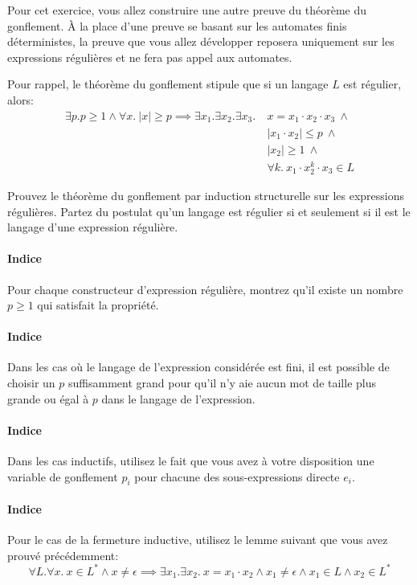 \documentclass[12pt,french,a4paper]{article}
\begin{document}
\begin{question}
Pour cet exercice, vous allez construire une autre preuve du théorème du gonflement.
À la place d'une preuve se basant sur les automates finis déterministes, la preuve que vous allez développer reposera uniquement sur les expressions régulières et ne fera pas appel aux automates.

Pour rappel, le théorème du gonflement stipule que si un langage $L$ est régulier, alors:
\begin{align*}
\exists p. p \geq 1 \wedge \forall x.\ |x| \geq p \implies \exists x_1. \exists x_2. \exists x_3.\ &x = x_1 \cdot x_2 \cdot x_3\ \wedge\\
&|x_1 \cdot x_2| \leq p\ \wedge\\
&|x_2| \geq 1\ \wedge\\
&\forall k.\ x_1 \cdot x_2^k \cdot x_3 \in L
\end{align*}

Prouvez le théorème du gonflement par induction structurelle sur les expressions régulières.
Partez du postulat qu'un langage est régulier si et seulement si il est le langage d'une expression régulière.

\paragraph{Indice} Pour chaque constructeur d'expression régulière, montrez qu'il existe un nombre $p \geq 1$ qui satisfait la propriété.

\paragraph{Indice} Dans les cas où le langage de l'expression considérée est fini, il est possible de choisir un $p$ suffisamment grand pour qu'il n'y aie aucun mot de taille plus grande ou égal à $p$ dans le langage de l'expression.

\paragraph{Indice} Dans les cas inductifs, utilisez le fait que vous avez à votre disposition une variable de gonflement $p_i$ pour chacune des sous-expressions directe $e_i$.

\paragraph{Indice} Pour le cas de la fermeture inductive, utilisez le lemme suivant que vous avez prouvé précédemment:
\[
\forall L. \forall x.\ x \in L^* \wedge x \neq \epsilon \implies \exists x_1. \exists x_2.\ x = x_1 \cdot x_2 \wedge x_1 \neq \epsilon \wedge x_1 \in L \wedge x_2 \in L^* 
\]
\end{question}
\end{document}
